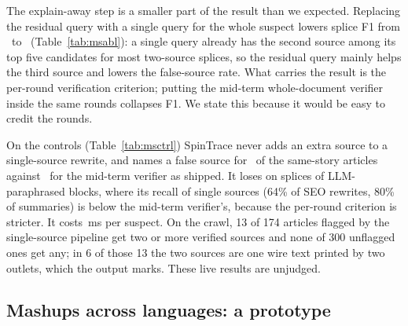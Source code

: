 \documentclass[11pt,a4paper]{article}
\begin{document}
\begin{table}[t]
  \centering\small
  \caption{Mashup ablations, each variant retuned on dev under the same false-source bar; test numbers.}
  \label{tab:msabl}
  \footnotesize
  \setlength{\tabcolsep}{3pt}
  
\end{table}

The explain-away step is a smaller part of the result than we expected. Replacing the residual query with a single query for the whole suspect lowers splice F1 from \nMsAblFull\ to \nMsAblNoResid\ (Table~\ref{tab:msabl}): a single query already has the second source among its top five candidates for most two-source splices, so the residual query mainly helps the third source and lowers the false-source rate. What carries the result is the per-round verification criterion; putting the mid-term whole-document verifier inside the same rounds collapses F1. We state this because it would be easy to credit the rounds.

\begin{table}[t]
  \centering\small
  \caption{Controls: extra sources named for single-source rewrites (a correct answer is none), and sources named for same-story and hard-negative articles (a correct answer is none), on test.}
  \label{tab:msctrl}
  \footnotesize
  \setlength{\tabcolsep}{3pt}
  
\end{table}

On the controls (Table~\ref{tab:msctrl}) SpinTrace never adds an extra source to a single-source rewrite, and names a false source for \nMsFalseSame\ of the same-story articles against \nMsFalseSameMid\ for the mid-term verifier as shipped. It loses on splices of LLM-paraphrased blocks, where its recall of single sources (64\% of SEO rewrites, 80\% of summaries) is below the mid-term verifier's, because the per-round criterion is stricter. It costs \nMsMs\,ms per suspect. On the crawl, 13 of 174 articles flagged by the single-source pipeline get two or more verified sources and none of 300 unflagged ones get any; in 6 of those 13 the two sources are one wire text printed by two outlets, which the output marks. These live results are unjudged.

\subsection{Mashups across languages: a prototype}
\label{sec:xlm}
\end{document}
